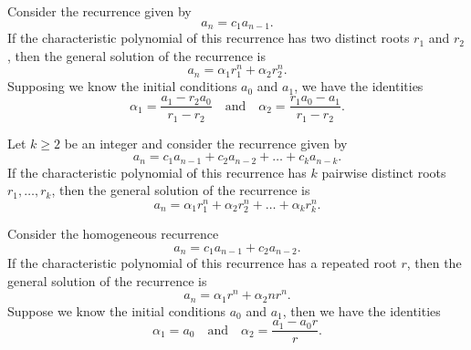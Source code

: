 \documentclass{tufte-handout}
\makeatletter
\renewcommand{\section}{\@startsection{section}%
    {3}{-1.01em}{-3ex \@plus -1ex \@minus -.2ex}%
    {1.5ex \@plus .2ex}
    {\hspace*{-5.5em}\fcolorbox{blue}{blue}{\parbox[c][1.0ex][b]{4em}{\phantom{space}}}
    \normalfont\Large\itshape\color{blue}}}
\makeatother
\begin{document}
\begin{Theorem}
    Consider the recurrence given by
    \[ a_n = c_1a_{n-1}.\]
    If the characteristic polynomial of this recurrence has two
    distinct roots \( r_1 \) and \( r_2 \), then the general solution
    of the recurrence is
    \[ a_n = \alpha_1r_1^n + \alpha_2r_2^n.\]
    Supposing we know the initial conditions \( a_0 \) and \( a_1 \),
    we have the identities
    \[\alpha_1 = \frac{a_1 - r_2a_0}{r_1 - r_2} 
    \quad \text{and} \quad \alpha_2 = \frac{r_1a_0 - a_1}{r_1 - r_2}.\]
\end{Theorem}

\begin{Theorem}
    Let \( k \geq 2 \) be an integer and consider the recurrence given by
    \[ a_n = c_1a_{n-1} + c_2a_{n-2} + \dots + c_ka_{n-k}.\]
    If the characteristic polynomial of this recurrence has \( k \) pairwise distinct roots
    \( r_1, \ldots, r_k \), then the general solution of the recurrence is
    \[ a_n = \alpha_1r_1^n + \alpha_2r_2^n + \dots + \alpha_kr_k^n.\]
\end{Theorem}

\begin{Theorem}
    Consider the homogeneous recurrence
    \[ a_n = c_1a_{n-1} + c_2a_{n-2}.\]
    If the characteristic polynomial of this recurrence has 
    a repeated root \( r \), then the general solution of
    the recurrence is
    \[ a_n = \alpha_1r^n + \alpha_2nr^n.\]
    Suppose we know the initial conditions \( a_0 \) and \( a_1 \),
    then we have the identities
    \[\alpha_1 = a_0 \quad \text{and} \quad \alpha_2 = \frac{a_1 - a_0r}{r}.\]
\end{Theorem}


\makeatletter
  \renewcommand{\section}{\@startsection{section}%
    {3}{0.8em}{-3ex \@plus -1ex \@minus -.2ex}%
    {1.5ex \@plus .2ex}
    {\hspace*{-5.5em}\fcolorbox{Periwinkle}{Periwinkle}{\parbox[c][1.0ex][b]{4em}{\phantom{space}}}
    \normalfont\Large\itshape\color{blue}}}
\makeatother



\end{document}
